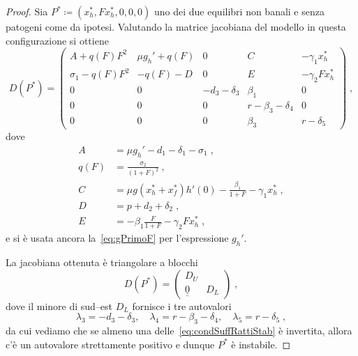 \begin{proof}
Sia $P^* \coloneq (x_h^*, F x_h^*, 0, 0,0)$ uno dei due equilibri non banali e senza patogeni come da ipotesi.
Valutando la matrice jacobiana del modello in questa configurazione si ottiene
$$D(P^*) =
\begin{pmatrix}
A + q(F) F^2 & \mu g_h' + q(F) & 0 & C & - \gamma_1 x_h^* \\
\sigma_1 -q(F) F^2 & -q(F) -D & 0 & E & - \gamma_2 F x_h^* \\
0 & 0 & -d_3 -\delta_3 & \beta_1 & 0 \\
0 & 0 & 0 & r - \beta_3 -\delta_4 & 0 \\
0 & 0 & 0 & \beta_3 & r -\delta_5
\end{pmatrix} \; ,
$$
dove
\begin{equation}
\begin{split}
A &= \mu g_h' - d_1 -\delta_1 -\sigma_1 \; , \\
q(F) &= \frac{\sigma_2}{(1+F)^2} \: , \\
C &= \mu g(x_h^* + x_f^*) h'(0) - \frac{\beta_1}{1+F} - \gamma_1 x_h^* \; , \\
D &= p + d_2 + \delta_2 \; , \\
E &= -\beta_1 \frac{F}{1+F} -\gamma_2 F x_h^* \; ,
\end{split}
\end{equation}
e si è usata ancora la~\eqref{eq:gPrimoF} per l'espressione $g_h'$.

La jacobiana ottenuta è triangolare a blocchi
$$ D(P^*) =
\begin{pmatrix}
D_U & \\
\underline{\underline{0}} & D_L
\end{pmatrix} \; ,
$$
dove il minore di sud--est $D_L$ fornisce i tre autovalori
\begin{equation}
\lambda_3 = -d_3 -\delta_3 , \quad
\lambda_4 = r -\beta_3 -\delta_4 , \quad
\lambda_5 = r -\delta_5 \; ,
\label{eq:ultimi3}
\end{equation}
da cui vediamo che se almeno una delle~\eqref{eq:condSuffRattiStab} è invertita, allora c'è un autovalore
strettamente positivo e dunque $P^*$ è instabile.


\end{proof}
